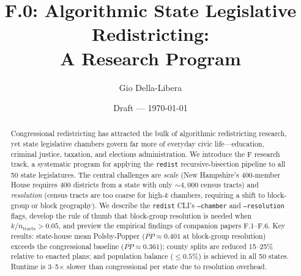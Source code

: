 \documentclass[12pt]{article}
\title{F.0: Algorithmic State Legislative Redistricting:\\
       A Research Program}
\author{Gio Della-Libera}
\date{Draft --- \today}
\begin{document}
\maketitle

\begin{abstract}
Congressional redistricting has attracted the bulk of algorithmic redistricting
research, yet state legislative chambers govern far more of everyday civic
life---education, criminal justice, taxation, and elections administration.
We introduce the F research track, a systematic program for applying the
\texttt{redist} recursive-bisection pipeline to all 50 state legislatures.
The central challenges are \emph{scale} (New Hampshire's 400-member House
requires $400$ districts from a state with only $\sim\!4{,}000$ census tracts)
and \emph{resolution} (census tracts are too coarse for high-$k$ chambers,
requiring a shift to block-group or block geography).
We describe the \texttt{redist} CLI's \texttt{--chamber} and \texttt{--resolution}
flags, develop the rule of thumb that block-group resolution is needed when
$k / n_{\mathrm{tracts}} > 0.05$, and preview the empirical findings of
companion papers F.1--F.6. Key results: state-house mean Polsby-Popper
($\overline{PP} \approx 0.401$ at block-group resolution) exceeds the
congressional baseline ($\overline{PP} \approx 0.361$); county splits are
reduced 15--25\% relative to enacted plans; and population balance
($\leq 0.5\%$) is achieved in all 50 states. Runtime is 3--5$\times$ slower
than congressional per state due to resolution overhead.
\end{abstract}











\end{document}
